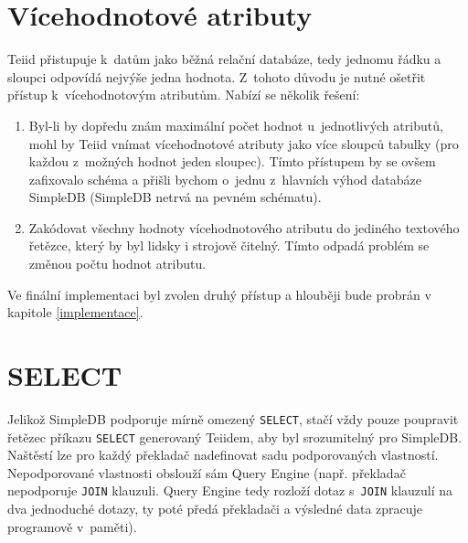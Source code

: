 \documentclass[oneside,12pt]{fithesis2}
\begin{document}
\section{Vícehodnotové atributy}
Teiid přistupuje k~datům jako běžná relační databáze, tedy jednomu řádku a sloupci odpovídá nejvýše jedna hodnota. Z~tohoto důvodu je nutné ošetřit přístup k~vícehodnotovým atributům. Nabízí se několik řešení:
\begin{enumerate}
 \item Byl-li by dopředu znám maximální počet hodnot u~jednotlivých atributů, mohl by Teiid vnímat vícehodnotové atributy jako více sloupců tabulky (pro každou z~možných hodnot jeden sloupec). Tímto přístupem by se ovšem zafixovalo schéma a přišli bychom o~jednu z~hlavních výhod databáze SimpleDB (SimpleDB netrvá na pevném schématu).
 \item Zakódovat všechny hodnoty vícehodnotového atributu do jediného textového řetězce, který by byl lidsky i strojově čitelný. Tímto odpadá problém se změnou počtu hodnot atributu.
\end{enumerate}
Ve finální implementaci byl zvolen druhý přístup a hlouběji bude probrán v kapitole \ref{implementace}.

\section{SELECT}
Jelikož SimpleDB podporuje mírně omezený \verb|SELECT|, stačí vždy pouze poupravit řetězec příkazu \verb|SELECT| generovaný Teiidem, aby byl srozumitelný pro SimpleDB. Naštěstí lze pro každý překladač nadefinovat sadu podporovaných vlastností. Nepodporované vlastnosti obslouží sám Query Engine (např. překladač nepodporuje \verb<JOIN< klauzuli. Query Engine tedy rozloží dotaz s~\verb<JOIN< klauzulí na dva jednoduché dotazy, ty poté předá překladači a výsledné data zpracuje programově v~paměti).
\end{document}
